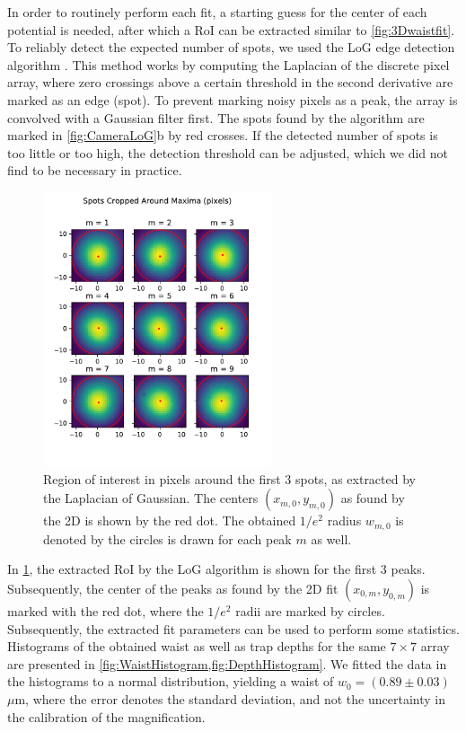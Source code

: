 In order to routinely perform each fit, a starting guess for the center of each potential is needed, after which a \ac{RoI} can be extracted similar to \cref{fig:3Dwaistfit}.
To reliably detect the expected number of spots, we used the \ac{LoG} edge detection algorithm \cite{Haralick1992}. This method works by computing the Laplacian of the discrete pixel array, where zero crossings above a certain threshold in the second derivative are marked as an edge (spot). 
To prevent marking noisy pixels as a peak, the array is convolved with a Gaussian filter first. 
The spots found by the algorithm are marked in \ref{fig:CameraLoG}b by red crosses. 
If the detected number of spots is too little or too high, the detection threshold can be adjusted, which we did not find to be necessary in practice. 

\begin{figure}
    \centering
    \includegraphics[width=0.6\textwidth]{figures/SpotsCropped_range12.pdf}
    \caption{Region of interest in pixels around the first 3 spots, as extracted by the Laplacian of Gaussian. 
    The centers $(x_{m,0},y_{m,0})$ as found by the 2D is shown by the red dot. 
    The obtained $1/e^2$ radius $w_{m,0}$ is denoted by the circles is drawn for each peak $m$ as well.}
    \label{fig:SpotsRoI}
\end{figure}

In \cref{fig:SpotsRoI}, the extracted \ac{RoI} by the \ac{LoG} algorithm is shown for the first 3 peaks. 
Subsequently, the center of the peaks as found by the 2D fit $(x_{0,m},y_{0,m})$ is marked with the red dot, where the $1/e^2$ radii are marked by circles. 
Subsequently, the extracted fit parameters can be used to perform some statistics.
Histograms of the obtained waist as well as trap depths for the same $7\times7$ array are presented in \cref{fig:WaistHistogram,fig:DepthHistogram}.
We fitted the data in the histograms to a normal distribution, yielding a waist of $w_0 = (0.89 \pm 0.03)$ $\mu$m, where the error denotes the standard deviation, and not the uncertainty in the calibration of the magnification. 

